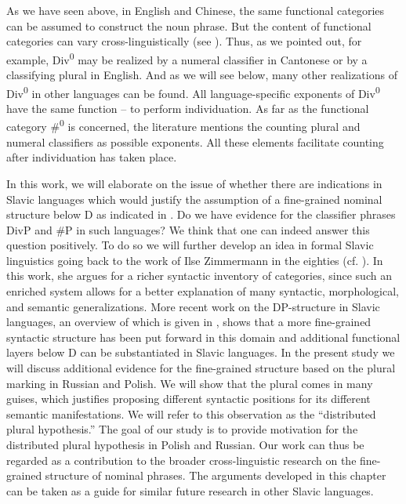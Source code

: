 \documentclass[output=paper,colorlinks,citecolor=brown]{langscibook}
\begin{document}
As we have seen above, in English and Chinese, the same functional categories can be assumed to construct the noun phrase. But the content of functional categories can vary cross-linguistically (see \citealt{RitterWiltschko2009}). Thus, as we pointed out, for example, Div\textsuperscript{0} may be realized by a numeral classifier in Cantonese or by a classifying plural in English. And as we will see below, many other realizations of Div\textsuperscript{0} in other languages can be found. All language-specific exponents of Div\textsuperscript{0} have the same function -- to perform individuation. As far as the functional category \#\textsuperscript{0} is concerned, the literature mentions the counting plural and numeral classifiers as possible exponents. All these elements facilitate counting after individuation has taken place. 

In this work, we will elaborate on the issue of whether there are indications in Slavic languages which would justify the assumption of a fine-grained nominal structure below D as indicated in . Do we have evidence for the classifier phrases DivP and \#P in such languages? We think that one can indeed answer this question positively. To do so we will further develop an idea in formal Slavic linguistics going back to the work of Ilse Zimmermann in the eighties (cf. \citealt{Zimmermann1983,gb:Zimmermann1988}). In this work, she argues for a richer syntactic inventory of categories, since such an enriched system allows for a better explanation of many syntactic, morphological, and semantic generalizations. More recent work on the DP-structure in Slavic languages, an overview of which is given in \citet{Geist2021}, shows that a more fine-grained syntactic structure has been put forward in this domain and additional functional layers below D can be substantiated in Slavic languages. In the present study we will discuss additional evidence for the fine-grained structure based on the plural marking in Russian and Polish. We will show that the plural comes in many guises, which justifies proposing different syntactic positions for its different semantic manifestations. We will refer to this observation as the ``distributed plural hypothesis.'' The goal of our study is to provide motivation for the distributed plural hypothesis in Polish and Russian. Our work can thus be regarded as a contribution to the broader cross-linguistic research on the fine-grained structure of nominal phrases. The arguments developed in this chapter can be taken as a guide for similar future research in other Slavic languages.
\end{document}
